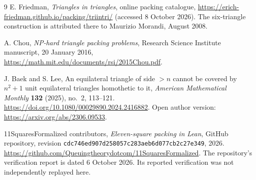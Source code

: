 \documentclass[11pt]{article}
\begin{document}
\clearpage
\begin{thebibliography}{9}
E. Friedman, \emph{Triangles in triangles}, online packing catalogue,
\url{https://erich-friedman.github.io/packing/triintri/} (accessed 8 October 2026).
The six-triangle construction is attributed there to Maurizio Morandi, August 2008.

A. Chou, \emph{NP-hard triangle packing problems}, Research Science Institute manuscript, 20 January 2016,
\url{https://math.mit.edu/documents/rsi/2015Chou.pdf}.

J. Baek and S. Lee, An equilateral triangle of side $>n$ cannot be covered by $n^2+1$ unit equilateral triangles homothetic to it, \emph{American Mathematical Monthly} \textbf{132} (2025), no.~2, 113--121.
\url{https://doi.org/10.1080/00029890.2024.2416882}.
Open author version: \url{https://arxiv.org/abs/2306.09533}.

11SquaresFormalized contributors, \emph{Eleven-square packing in Lean}, GitHub repository, revision \texttt{cdc746ed907d258057c283aeb6d077cb2c27e349}, 2026.
\url{https://github.com/Queuingtheorydotcom/11SquaresFormalized}.
The repository's verification report is dated 6 October 2026. Its reported verification was not independently replayed here.
\end{thebibliography}
\end{document}

